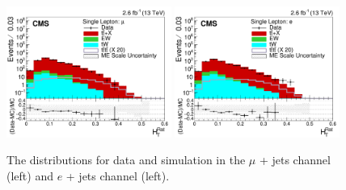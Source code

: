\begin{figure}[ht!]
    \includegraphics[width=0.48\textwidth]{images/Run2/HTRat_StackLogY.pdf}
    \includegraphics[width=0.48\textwidth]{images/Run2/HTRat_StackLogY_e.pdf}
    \caption{The \HTrat distributions for data and simulation in the $\mu$ + jets channel (left) and $e$ + jets channel (left).}
    \label{fig:HTRat}
\end{figure}




